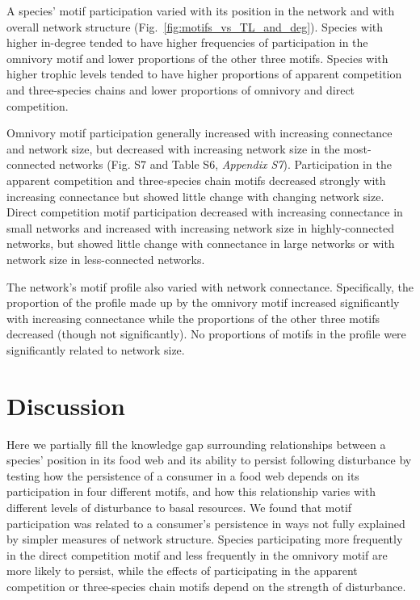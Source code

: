 \documentclass[12pt]{article}
\begin{document}
\begin{spacing}{1.0}
        A species' motif participation varied with its position in the network and with overall network structure (Fig.~\ref{fig:motifs_vs_TL_and_deg}).
        Species with higher in-degree tended to have higher frequencies of participation in the omnivory motif and lower proportions of the other three motifs.
        Species with higher trophic levels tended to have higher proportions of apparent competition and three-species chains and lower proportions of omnivory and direct competition. 
        
        
        Omnivory motif participation generally increased with increasing connectance and network size, but decreased with increasing network size in the most-connected networks (Fig. S7 and Table S6, \emph{Appendix S7}).
        Participation in the apparent competition and three-species chain motifs decreased strongly with increasing connectance but showed little change with changing network size.
        Direct competition motif participation decreased with increasing connectance in small networks and increased with increasing network size in highly-connected networks, but showed little change with connectance in large networks or with network size in less-connected networks.

        
        The network's motif profile also varied with network connectance.
        Specifically, the proportion of the profile made up by the omnivory motif increased significantly  with increasing connectance while the proportions of the other three motifs decreased (though not significantly).
        No proportions of motifs in the profile were significantly related to network size.


\section*{Discussion}
    
    Here we partially fill the knowledge gap surrounding relationships between a species' position in its food web and its ability to persist following disturbance by testing how the persistence of a consumer in a food web depends on its participation in four different motifs, and how this relationship varies with different levels of disturbance to basal resources. 
    We found that motif participation was related to a consumer's persistence in ways not fully explained by simpler measures of network structure. 
    Species participating more frequently in the direct competition motif and less frequently in the omnivory motif are more likely to persist, while the effects of participating in the apparent competition or three-species chain motifs depend on the strength of disturbance.



\end{spacing}
\end{document}
